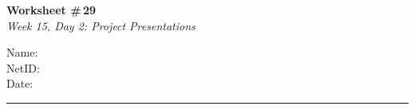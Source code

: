 \documentclass[11pt]{article}
\begin{document}
\noindent
\begin{minipage}[t]{0.55\textwidth}
  \vspace{0pt}
  {\LARGE \textbf{Worksheet \#\,29}} \\[0.3em]
  {\large \textit{Week 15, Day 2: Project Presentations}}
\end{minipage}
\hfill
\begin{minipage}[t]{0.40\textwidth}
  \vspace{0pt}
  \begin{mdframed}[linecolor=black, linewidth=1pt, innertopmargin=10pt, innerbottommargin=10pt]
    \small
    \vspace{0.4cm}
    Name: \underline{\hspace{4.5cm}} \\[1em]
    NetID: \underline{\hspace{4.3cm}} \\[1em]
    Date: \underline{\hspace{4.4cm}} \\
  \end{mdframed}
\end{minipage}

\vspace{1em}
\noindent\rule{\linewidth}{1pt}
\vspace{0.2em}
\end{document}
